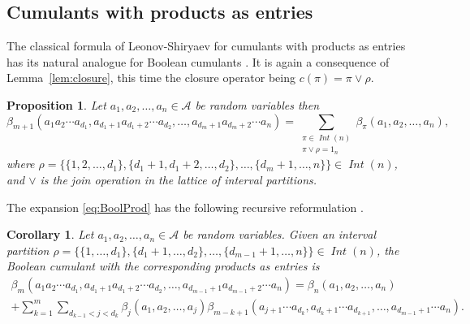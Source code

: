 \documentclass[12pt]{amsart}
\DeclareMathOperator{\IntPart}{\mathit{Int}}
\DeclareMathOperator{\descents}{\mathcal{D}}
\newcommand{\alg}[1]{\mathcal{#1}}
\newtheorem{proposition}[theorem]{Proposition}
\newtheorem{corollary}[theorem]{Corollary}
\theoremstyle{definition}
\numberwithin{equation}{section}
\begin{document}
\subsection{Cumulants with products as entries}
The classical formula of Leonov-Shiryaev for cumulants with products as entries
has its natural analogue for Boolean cumulants
\cite[Theorem~4.2]{Speicher:2000:conceptual}.
It is again a consequence of Lemma~\ref{lem:closure},
this time the closure operator being $c(\pi)=\pi\vee\rho$.
\begin{proposition}
  Let $a_1,a_2,\dots,a_n\in \alg{A}$ be random variables
  then
  \begin{equation}
   \label{eq:BoolProd}
    \beta_{m+1}(a_1a_2\cdots a_{d_1},a_{d_1+1}a_{d_1+2}\cdots a_{d_2},\ldots,a_{d_{m}+1}a_{d_{m}+2}\cdots a_{n})
    =\sum_{\substack{\pi \in \IntPart(n)\\ \pi \vee \rho=1_n}}\beta_\pi(a_1,a_2,\ldots,a_n),
  \end{equation}
  where
  $\rho=\{\{1,2,\ldots,d_1\},\{d_1+1,d_1+2,\ldots,d_2\},\ldots,\{d_m+1,\ldots,n\}\}\in
  \IntPart(n)$, and $\vee$ is the join operation in the lattice of interval partitions.
\end{proposition}
The expansion \eqref{eq:BoolProd} has the following recursive reformulation
\cite{LehnerSzpojankowski:2023:freeint1}.
\begin{corollary}
  Let $a_1,a_2,\dots,a_n\in \alg{A}$ be random variables.
  Given an  interval partition
  $\rho=\{\{1,\ldots,d_1\},\{d_1+1,\ldots,d_2\},\ldots,\{d_{m-1}+1,\ldots,n\}\}\in
  \IntPart(n)$, the Boolean cumulant with the corresponding products as entries
  is
      \begin{equation}
    \label{eq:RecursiveBoolProd}
    \begin{multlined}
      \beta_{m}(a_1a_2\cdots a_{d_1},a_{d_1+1}a_{d_1+2}\cdots a_{d_2},\ldots,a_{d_{m-1}+1}a_{d_{m-1}+2}\cdots a_{n})
      =
      \beta_{n}(a_1,a_2,\ldots, a_{n})
      \\
      + 
      \sum_{k=1}^m \sum_{d_{k-1}<j<d_k} 
      \beta_{j}(a_1,a_2,\ldots,a_j)\beta_{m-k+1}(a_{j+1}%
      \cdots
      a_{d_k},a_{d_k+1}%
      \dotsm a_{d_{k+1}},\ldots,a_{d_{m-1}+1}\cdots a_n).
    \end{multlined}
  \end{equation}
\end{corollary}
\end{document}
